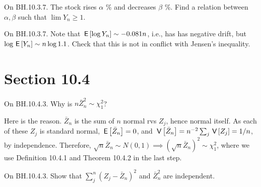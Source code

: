 \begin{exercise}
On BH.10.3.7. The stock rises $\alpha$ \% and decreases $\beta$ \%. Find a relation between  $\alpha, \beta$  such that $\lim Y_{n}\geq 1$.
\begin{hint}
\end{hint}
\begin{solution}
\end{solution}
\end{exercise}

\begin{exercise}
On BH.10.3.7. Note that $\,\mathsf{E}\left[\log Y_n\right] \sim -0.081 n$, i.e., has has negative drift, but $\log \,\mathsf{E}\left[Y_n\right] \sim n \log 1.1$. Check that this is not in conflict with Jensen's inequality.
\begin{hint}
\end{hint}
\begin{solution}
\end{solution}
\end{exercise}

\section{Section 10.4}
\label{sec:section-10.4}

\begin{exercise}
On BH.10.4.3. Why is $n \bar Z_n^2\sim \chi_1^2$?
\begin{hint}
\end{hint}
\begin{solution}
Here is the reason.
$\bar Z_n$ is the sum of $n$ normal rvs $Z_j$, hence normal itself.
As each of these $Z_j$ is standard normal, $\,\mathsf{E}\left[\bar Z_n\right]=0$, and $\,\mathsf{V}\left[\bar Z_n\right]=n^{-2}\sum_{j} \,\mathsf{V}\left[Z_{j}\right]=1/n$, by independence.
Therefore, $\sqrt{n} \bar Z_{n} \sim N(0,1) \implies (\sqrt{n}\bar Z_n)^2 \sim \chi_1^2$, where we use Definition 10.4.1 and Theorem 10.4.2 in the last step.
\end{solution}
\end{exercise}

\begin{exercise}
On BH.10.4.3. Show that $\sum_j^n (Z_j-\bar Z_n)^2$ and $\bar Z_n^2$ are independent.
\begin{hint}
\end{hint}
\begin{solution}
\end{solution}
\end{exercise}

